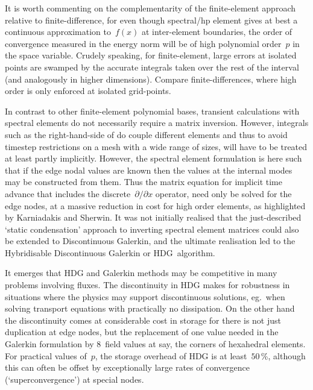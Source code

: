 It is worth commenting on the complementarity of  the finite-element approach relative to finite-difference,
for even though spectral/hp element gives at best  a continuous approximation
to~$f(x)$ at inter-element boundaries, the order of convergence measured in the
energy norm will be of high polynomial order~$p$ in the space variable. 
Crudely speaking, for finite-element, large errors at isolated points are swamped by the accurate integrals
taken over the rest of the interval (and analogously in higher dimensions). Compare
finite-differences, where high order is only enforced at isolated grid-points.

In contrast to other finite-element polynomial bases, transient calculations
with spectral elements do not necessarily require a matrix inversion. However,
integrals such as the right-hand-side of  do couple different elements and thus to
avoid timestep restrictions on a mesh with a wide range of sizes,
will have to be treated at least partly implicitly.
However, the spectral element formulation is here such that if the edge nodal values are known
then the values at the internal modes may be constructed from them. Thus the matrix
equation for implicit time advance that includes the discrete~$\partial /\partial x$ operator,
need only be solved for the edge nodes, at a massive reduction in cost for
high order elements, as highlighted by
Karniadakis and Sherwin.  %
It was not initially realised that the just-described `static condensation' approach to
inverting spectral element matrices could also be extended to Discontinuous
Galerkin, and the ultimate realisation led to the Hybridisable Discontinuous
Galerkin or HDG~algorithm. 

It emerges that HDG and Galerkin methods may be competitive in many problems
involving fluxes. The discontinuity in HDG makes for robustness in 
situations where the physics may support discontinuous solutions,
eg.\ when solving transport equations with practically no dissipation.
On the other hand the discontinuity comes at considerable cost in storage
for there is not just duplication at edge nodes, but the replacement of
one value needed in the Galerkin formulation
by $8$~field values at say, the corners of hexahedral elements.
For practical values of~$p$, the storage overhead of HDG is at least~$50$\,\%,
although this can often be offset by exceptionally large rates of
convergence (`superconvergence') at special nodes.







